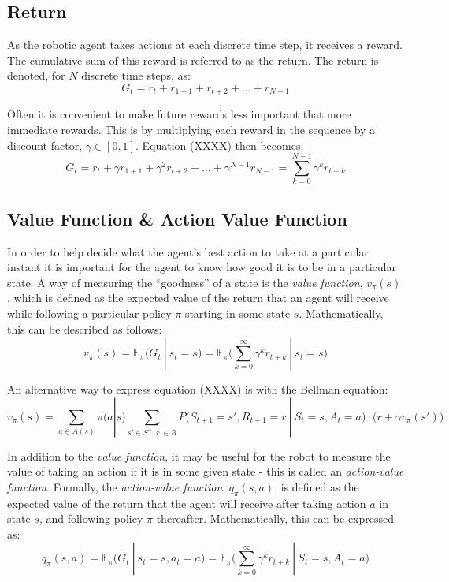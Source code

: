 \documentclass[a4paper]{article}
\begin{document}
\subsection{Return}
As the robotic agent takes actions at each discrete time step, it receives a reward. The cumulative sum of this reward is referred to as the return. The return is denoted, for $N$ discrete time steps, as:
\begin{equation}
G_t = r_t + r_{1+1} + r_{t+2} + \ldots + r_{N-1}
\end{equation}

Often it is convenient to make future rewards less important that more immediate rewards. This is by multiplying each reward in the sequence by a discount factor, $\gamma \in [0,1]$. Equation (XXXX) then becomes:
\begin{equation}
G_t = r_t + \gamma r_{1+1} + \gamma^2 r_{t+2} + \ldots + \gamma^{N-1} r_{N-1} = \sum_{k = 0}^{N-1} \gamma^k r_{t+k}
\end{equation} 

\subsection{Value Function \& Action Value Function}
In order to help decide what the agent's best action to take at a particular instant it is important for the agent to know how good it is to be in a particular state. A way of measuring the ``goodness'' of a state is the \textit{value function}, $v_{\pi}(s)$, which is defined as the expected value of the return that an agent will receive while following a particular policy $\pi$ starting in some state $s$. Mathematically, this can be described as follows:
\begin{equation}
v_{\pi}(s) = \mathbb{E}_{\pi} ( G_t \ | \ s_t = s ) = \mathbb{E}_{\pi} \bigg( \sum_{k=0}^{\infty} \gamma^k r_{t+k} \ | \ s_t = s \bigg)
\end{equation}

An alternative way to express equation (XXXX) is with the Bellman equation:
\begin{equation}
v_{\pi}(s) = \sum_{a \in A(s)} \pi\big(a | s\big) \sum_{s' \in S^+, r \ \in R} P\big(S_{t+1}=s', R_{t+1} = r \ | \ S_t=s, A_t=a\big) \cdot \big(r + \gamma v_{\pi}(s')\big)
\end{equation} 

In addition to the \textit{value function}, it may be useful for the robot to measure the value of taking an action if it is in some given state - this is called an \textit{action-value function}. Formally, the \textit{action-value function}, $q_{\pi}(s,a)$, is defined as the expected value of the return that the agent will receive after taking action $a$ in state $s$, and following policy $\pi$ thereafter. Mathematically, this can be expressed as:
\begin{equation}
q_{\pi}(s,a) = \mathbb{E}_{\pi} (G_t \ | \ s_t = s, a_t = a) = \mathbb{E}_{\pi} \bigg( \sum_{k=0}^{\infty} \gamma^k r_{t+k} \ | \ S_t=s, A_t=a \bigg)
\end{equation}
\end{document}
